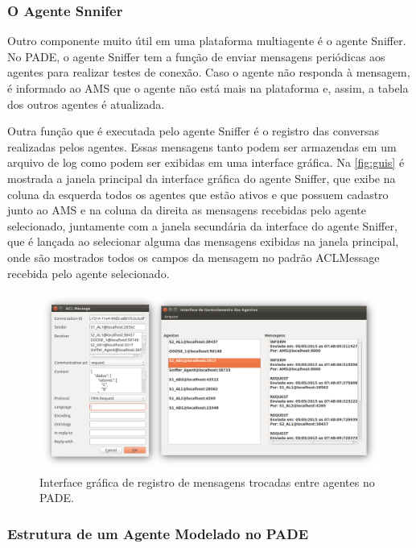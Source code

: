 \documentclass[journal]{IEEEtran}
\begin{document}
\subsubsection{O Agente Snnifer}

Outro componente muito útil em uma plataforma multiagente é o agente Sniffer. No PADE, o agente Sniffer tem a função de enviar mensagens periódicas aos agentes para realizar testes de conexão. Caso o agente não responda à mensagem, é informado ao AMS que o agente não está mais na plataforma e, assim, a tabela dos outros agentes é atualizada.

Outra função que é executada pelo agente Sniffer é o registro das conversas realizadas pelos agentes. Essas mensagens tanto podem ser armazendas em um arquivo de log como podem ser exibidas em uma interface gráfica. Na  \autoref{fig:guis} é mostrada a janela principal da interface gráfica do agente Sniffer, que exibe na coluna da esquerda todos os agentes que estão ativos e que possuem cadastro junto ao AMS e na coluna da direita as mensagens recebidas pelo agente selecionado, juntamente com a janela secundária da interface do agente Sniffer, que é lançada ao selecionar alguma das mensagens exibidas na janela principal, onde são mostrados todos os campos da mensagem no padrão ACLMessage recebida pelo agente selecionado.

\begin{figure}[!htb]
        \centering
        \includegraphics[width=5.0in]{Figuras/guis.png}
        \caption{\label{fig:guis} Interface gráfica de registro de mensagens trocadas entre agentes no PADE.}
\end{figure} 

\subsubsection{Estrutura de um Agente Modelado no PADE}
\end{document}
